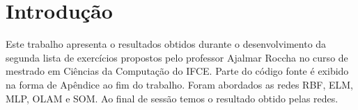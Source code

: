 \documentclass[
	article,			%
	11pt,				%
	oneside,			%
	a4paper,			%
	english,			%
	brazil,				%
	sumario=tradicional
	]{abntex2}
\begin{document}



%
%
\maketitle
\frenchspacing 



\textual

\section*{Introdução}
Este trabalho apresenta o resultados obtidos durante o desenvolvimento da
segunda lista de exercícios propostos pelo professor Ajalmar Roccha no curso de
mestrado em Ciências da Computação do IFCE. Parte do código fonte é exibido na
forma de Apêndice ao fim do trabalho. Foram abordados as redes RBF, ELM, MLP,
OLAM e SOM. Ao final de sessão temos o resultado obtido pelas redes.
\end{document}
